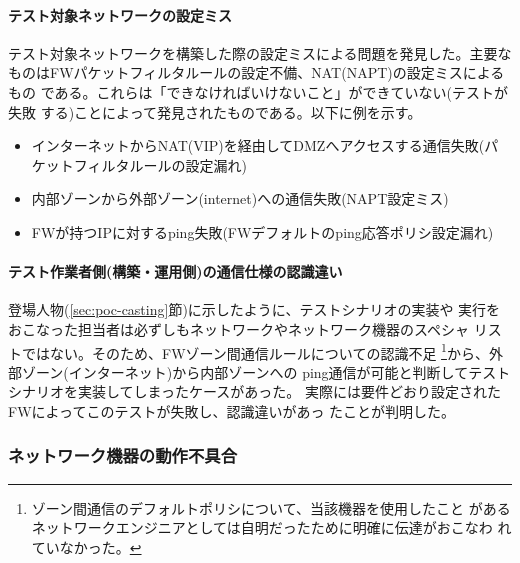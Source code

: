     \paragraph{テスト対象ネットワークの設定ミス}
テスト対象ネットワークを構築した際の設定ミスによる問題を発見した。主要な
ものはFWパケットフィルタルールの設定不備、NAT(NAPT)の設定ミスによるもの
である。これらは「できなければいけないこと」ができていない(テストが失敗
する)ことによって発見されたものである。以下に例を示す。
\begin{itemize}
 \item インターネットからNAT(VIP)を経由してDMZへアクセスする通信失敗(パ
       ケットフィルタルールの設定漏れ)
 \item \yo 内部ゾーンから外部ゾーン(internet)への通信失敗(NAPT設定ミス)
 \item FWが持つIPに対するping失敗(FWデフォルトのping応答ポリシ設定漏れ)
\end{itemize}

    \paragraph{テスト作業者側(構築・運用側)の通信仕様の認識違い}
登場人物(\ref{sec:poc-casting}節)に示したように、テストシナリオの実装や
実行をおこなった担当者は必ずしもネットワークやネットワーク機器のスペシャ
リストではない。そのため、FWゾーン間通信ルールについての認識不足
\footnote{ゾーン間通信のデフォルトポリシについて、当該機器を使用したこと
があるネットワークエンジニアとしては自明だったために明確に伝達がおこなわ
れていなかった。}から、\yo 外部ゾーン(インターネット)から内部ゾーンへの
ping通信が可能と判断してテストシナリオを実装してしまったケースがあった。
実際には要件どおり設定されたFWによってこのテストが失敗し、認識違いがあっ
たことが判明した。

   \subsubsection{ネットワーク機器の動作不具合}
   \label{sec:find-nw-device-bug}


